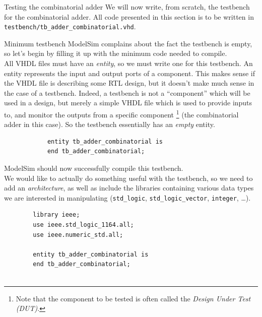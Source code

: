 \documentclass[a4paper, 12pt, onecolumn]{article}
\begin{document}
\begin{section}{Testing the combinatorial adder}
    We will now write, from scratch, the testbench for the combinatorial adder. All code presented in this section is to be written in \texttt{testbench/tb\_adder\_combinatorial.vhd}.

    \begin{subsection}{Minimum testbench}
        ModelSim complains about the fact the testbench is empty, so let's begin by filling it up with the minimum code needed to compile. \\

        All VHDL files must have an \emph{entity}, so we must write one for this testbench. An entity represents the input and output ports of a component. This makes sense if the VHDL file is describing some RTL design, but it doesn't make much sense in the case of a testbench. Indeed, a testbench is not a ``component'' which will be used in a design, but merely a simple VHDL file which is used to provide inputs to, and monitor the outputs from a specific component \footnote{Note that the component to be tested is often called the \emph{Design Under Test (DUT)}.} (the combinatorial adder in this case). So the testbench essentially has an \emph{empty} entity.

        \begin{verbatim}
            entity tb_adder_combinatorial is
            end tb_adder_combinatorial;
        \end{verbatim}
        \vspace{-1em}
    \end{subsection}

    ModelSim should now successfully compile this testbench. \\

    We would like to actually do something useful with the testbench, so we need to add an \emph{architecture}, as well as include the libraries containing various data types we are interested in manipulating (\texttt{std\_logic}, \texttt{std\_logic\_vector}, \texttt{integer}, \ldots).

    \begin{verbatim}
        library ieee;
        use ieee.std_logic_1164.all;
        use ieee.numeric_std.all;

        entity tb_adder_combinatorial is
        end tb_adder_combinatorial;


\end{verbatim}
\end{section}
\end{document}
